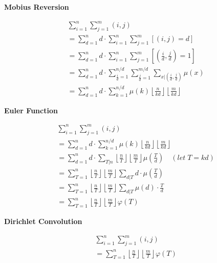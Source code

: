 \noindent\textbf{Mobius Reversion}

\begin{equation*}
	\begin{aligned}
		& \sum\limits_{i=1}^{n} \sum\limits_{j=1}^{m} (i, j) \\
		& = \sum\limits_{d=1}^{n} d \cdot \sum\limits_{i=1}^{n} \sum\limits_{j=1}^{m} [(i, j) = d] \\
		& = \sum\limits_{d=1}^{n} d \cdot \sum\limits_{i=1}^{n} \sum\limits_{j=1}^{m} \left[\left(\frac{i}{d}, \frac{j}{d}\right) = 1\right] \\
		& = \sum\limits_{d=1}^{n} d \cdot \sum\limits_{\frac{i}{d}=1}^{n/d} \sum\limits_{\frac{j}{d}=1}^{m/d} \sum\limits_{x|(\frac{i}{d}, \frac{j}{d})} \mu(x) \\
		& = \sum\limits_{d=1}^{n}d \cdot \sum\limits_{k=1}^{n/d} \mu(k) \left\lfloor \frac{n}{kd} \right\rfloor \left\lfloor \frac{m}{kd} \right\rfloor
	\end{aligned}
\end{equation*}

\noindent\textbf{Euler Function}

\begin{equation*}
	\begin{aligned}
		& \sum\limits_{i=1}^{n} \sum\limits_{j=1}^{m} (i, j) \\
		& = \sum\limits_{d=1}^{n}d \cdot \sum\limits_{k=1}^{n/d} \mu(k) \left\lfloor \frac{n}{kd} \right\rfloor \left\lfloor \frac{m}{kd} \right\rfloor \\
		& = \sum\limits_{d=1}^{n} d \cdot \sum\limits_{T|n} \left\lfloor \frac{n}{T} \right\rfloor \left\lfloor \frac{m}{T} \right\rfloor \mu(\frac{T}{d}) \quad (let \; T = kd) \\
		& = \sum\limits_{T=1}^{n} {\left\lfloor \frac{n}{T} \right\rfloor}{\left\lfloor \frac{m}{T} \right\rfloor} \sum\limits_{d|T} d \cdot \mu({\frac{T}{d}}) \\
		& = \sum\limits_{T=1}^{n} {\left\lfloor \frac{n}{T} \right\rfloor}{\left\lfloor \frac{m}{T} \right\rfloor} \sum\limits_{d|T} \mu(d) \cdot \frac{T}{d} \\
		& = \sum\limits_{T=1}^{n} {\left\lfloor \frac{n}{T} \right\rfloor}{\left\lfloor \frac{m}{T} \right\rfloor} \varphi(T)
	\end{aligned}
\end{equation*}

\noindent\textbf{Dirichlet Convolution}

\begin{equation*}
	\begin{aligned}
		& \sum\limits_{i=1}^{n} \sum\limits_{j=1}^{m} (i, j) \\
		& = \sum\limits_{T=1}^{n} {\left\lfloor \frac{n}{T} \right\rfloor}{\left\lfloor \frac{m}{T} \right\rfloor} \varphi(T)
	\end{aligned}
\end{equation*}

